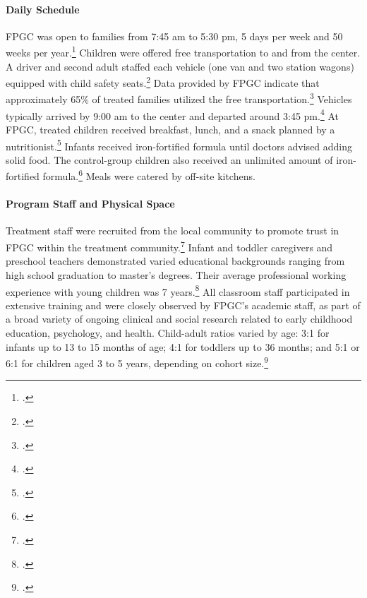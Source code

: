 \begin{appendices}
\paragraph{Daily Schedule}
\noindent FPGC was open to families from 7:45 am to 5:30 pm, 5 days per week and 50 weeks per year.\footnote{\citet{Ramey_Collier_etal_1976_CarolinaAbecedarianProject}.} Children were offered free transportation to and from the center. A driver and second adult staffed each vehicle (one van and two station wagons) equipped with child safety seats.\footnote{\citet{Ramey_Campbell_1979_SR,abc2014-2015interviews}.} Data provided by FPGC indicate that approximately 65\% of treated families utilized the free transportation.\footnote{\citet{Barnett_Masse_2002_benefitcost}.} Vehicles typically arrived by 9:00 am to the center and departed around 3:45 pm.\footnote{\citet{Ramey-et-al_1977_Intro-to-ABC}.} At FPGC, treated children received breakfast, lunch, and a snack planned by a nutritionist.\footnote{ \citet{Haskins_1985_CD,Ramey-et-al_1977_Intro-to-ABC}.} Infants received iron-fortified formula  until doctors advised adding solid food. The control-group children also received an unlimited amount of iron-fortified formula.\footnote{\citet{Campbell_Conti_etal_2014_EarlyChildhoodInvestments,abc2014-2015interviews}.} Meals were catered by off-site kitchens. \\

\paragraph{Program Staff and Physical Space}
\noindent Treatment staff were recruited from the local community to promote trust in FPGC within the treatment community.\footnote{\citet{Ramey-et-al_1977_Intro-to-ABC,Feagans_1996_Childrens-Talk,abc2014-2015interviews}.} Infant and toddler caregivers and preschool teachers demonstrated varied educational backgrounds ranging from high school graduation to master's degrees. Their average professional working experience with young children was 7 years.\footnote{\citet{Ramey_McGinness_etal_1982_Abecedarianapproach}.} All classroom staff participated in extensive training and were closely observed by FPGC's academic staff, as part of a broad variety of ongoing clinical and social research related to early childhood education, psychology, and health. Child-adult ratios varied by age: 3:1 for infants up to 13 to 15 months of age; 4:1 for toddlers up to 36 months; and 5:1 or 6:1 for children aged 3 to 5 years, depending on cohort size.\footnote{\citet{Ramey-et-al_1977_Intro-to-ABC,Ramey_Campbell_1979_SR,Ramey_McGinness_etal_1982_Abecedarianapproach}.}\\


\end{appendices}
